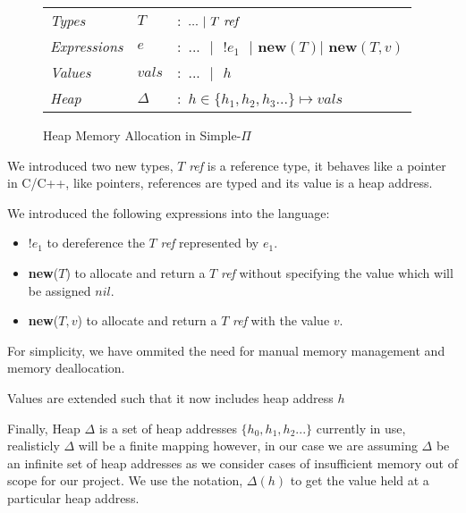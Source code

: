 \documentclass[a4paper,12pt]{report}
\begin{document}
\begin{figure}[H]
  \begin{center}
    \begin{tabular} {l l l}
      \textit{Types} & $T$ & $:$ $...\text{ }|\text{ }T\text{ \textit{ref }}$ \\
      \textit{Expressions} & $e$ & $:$ $...\text{ }|\text{ }!e_1\text{ }|\textbf{ new}(T)|\textbf{ new}(T, v)$\\
     \textit{Values} & $vals$& $:$ $...\text{ }|\text{ }h$ \\
     \textit{Heap} & $\Delta$& $:$ $h \in \{h_1,h_2, h_3...\} \mapsto vals$\\
    \end{tabular}
  \end{center}
  \caption{Heap Memory Allocation in Simple-$\Pi$}
\end{figure}

\par
We introduced two new types, $T$ \textit{ref} is a reference type, it behaves 
like a pointer in C/C++, like pointers, references are typed and its value is a heap address. 


\par
We introduced the following expressions into the language:
\begin{itemize}
  \item $!e_1$ to dereference the $T$ \textit{ref} represented by $e_1$.
  \item \textbf{new}($T$) to allocate and return a $T$ \textit{ref} without specifying the value 
  which will be assigned $nil$.
  \item \textbf{new}($T, v$) to allocate and return a $T$ \textit{ref} with the 
  value $v$.
\end{itemize}
\par
For simplicity, we have ommited the need for manual memory management and memory 
deallocation.

\par
Values are extended such that it now includes heap address $h$

\par
Finally, Heap $\Delta$ is a set of heap addresses $\{h_0, h_1, h_2...\}$ currently in use, 
realisticly $\Delta$ will be a finite mapping however, in our case we are assuming 
$\Delta$ be an infinite set of heap addresses as we consider cases of 
insufficient memory out of scope for our project. We use the notation, $\Delta(h)$ 
to get the value held at a particular heap address. 
\end{document}
